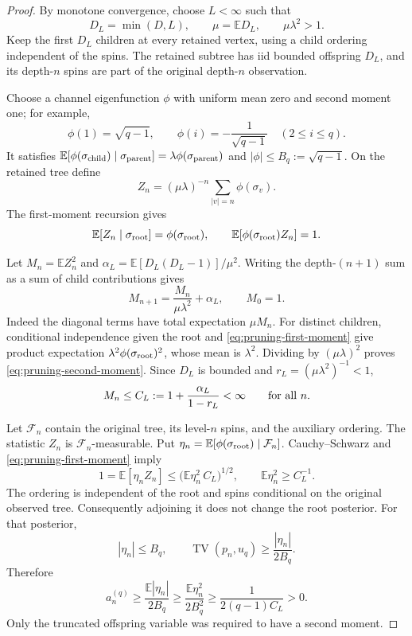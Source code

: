 \begin{proof}
By monotone convergence, choose $L<\infty$ such that
\[
 D_L=\min(D,L),\qquad \mu=\mathbb E D_L,
 \qquad \mu\lambda^2>1.
\]
Keep the first $D_L$ children at every retained vertex, using a child
ordering independent of the spins.  The retained subtree has iid bounded
offspring $D_L$, and its depth-$n$ spins are part of the original
depth-$n$ observation.

Choose a channel eigenfunction $\phi$ with uniform mean zero and second
moment one; for example,
\[
 \phi(1)=\sqrt{q-1},\qquad
 \phi(i)=-\frac1{\sqrt{q-1}}\quad(2\le i\le q).
\]
It satisfies
$\mathbb E[\phi(\sigma_{\rm child})\mid\sigma_{\rm parent}]
=\lambda\phi(\sigma_{\rm parent})$ and
$|\phi|\le B_q:=\sqrt{q-1}$.
On the retained tree define
\[
 Z_n=(\mu\lambda)^{-n}
       \sum_{|v|=n}\phi(\sigma_v).
\]
The first-moment recursion gives
\begin{equation}
 \mathbb E[Z_n\mid\sigma_{\rm root}]
 =\phi(\sigma_{\rm root}),\qquad
 \mathbb E[\phi(\sigma_{\rm root})Z_n]=1.
 \label{eq:pruning-first-moment}
\end{equation}

Let $M_n=\mathbb E Z_n^2$ and
$\alpha_L=\mathbb E[D_L(D_L-1)]/\mu^2$.  Writing the depth-$(n+1)$
sum as a sum of child contributions gives
\begin{equation}
 M_{n+1}=\frac{M_n}{\mu\lambda^2}+\alpha_L,
 \qquad M_0=1.
 \label{eq:pruning-second-moment}
\end{equation}
Indeed the diagonal terms have total expectation $\mu M_n$.  For distinct
children, conditional independence given the root and
\eqref{eq:pruning-first-moment} give product expectation
$\lambda^2\phi(\sigma_{\rm root})^2$, whose mean is $\lambda^2$.
Dividing by $(\mu\lambda)^2$ proves
\eqref{eq:pruning-second-moment}.  Since $D_L$ is bounded and
$r_L=(\mu\lambda^2)^{-1}<1$,
\[
 M_n\le C_L:=1+\frac{\alpha_L}{1-r_L}<\infty
 \qquad\hbox{for all }n.
\]

Let $\mathcal F_n$ contain the original tree, its level-$n$ spins, and
the auxiliary ordering.  The statistic $Z_n$ is $\mathcal F_n$-measurable.
Put $\eta_n=\mathbb E[\phi(\sigma_{\rm root})\mid\mathcal F_n]$.
Cauchy--Schwarz and \eqref{eq:pruning-first-moment} imply
\[
 1=\mathbb E[\eta_nZ_n]
 \le\bigl(\mathbb E\eta_n^2\,C_L\bigr)^{1/2},
 \qquad \mathbb E\eta_n^2\ge C_L^{-1}.
\]
The ordering is independent of the root and spins conditional on the
original observed tree.  Consequently adjoining it does not change the
root posterior.  For that posterior,
\[
 |\eta_n|\le B_q,\qquad
 \operatorname{TV}(p_n,u_q)\ge\frac{|\eta_n|}{2B_q}.
\]
Therefore
\begin{equation}
 a_n^{(q)}
 \ge\frac{\mathbb E|\eta_n|}{2B_q}
 \ge\frac{\mathbb E\eta_n^2}{2B_q^2}
 \ge\frac1{2(q-1)C_L}>0.
 \label{eq:supercritical-advantage}
\end{equation}
Only the truncated offspring variable was required to have a second
moment.
\end{proof}

